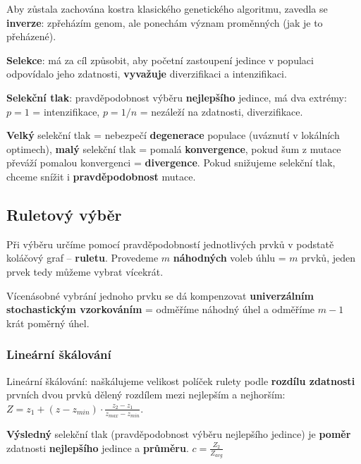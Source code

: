 \vspace{4pt}
\noindent Aby zůstala zachována kostra klasického genetického algoritmu, zavedla se \textbf{inverze}: zpřeházím genom, ale ponechám význam proměnných (jak je to přeházené).

\vspace{4pt}
\noindent \textbf{Selekce}: má za cíl způsobit, aby početní zastoupení jedince v populaci odpovídalo jeho zdatnosti, \textbf{vyvažuje} diverzifikaci a intenzifikaci.

\vspace{4pt}
\noindent \textbf{Selekční tlak}: pravděpodobnost výběru \textbf{nejlepšího} jedince, má dva extrémy: $p = 1$ = intenzifikace, $p = 1/n$ = nezáleží na zdatnosti, diverzifikace.

\vspace{4pt}
\noindent \textbf{Velký} selekční tlak = nebezpečí \textbf{degenerace} populace (uváznutí v lokálních optimech), \textbf{malý} selekční tlak = pomalá \textbf{konvergence}, pokud šum z mutace převáží pomalou konvergenci = \textbf{divergence}. Pokud snižujeme selekční tlak, chceme snížit i \textbf{pravděpodobnost} mutace.

\subsection{Ruletový výběr}

Při výběru určíme pomocí pravděpodobností jednotlivých prvků v podstatě koláčový graf – \textbf{ruletu}. Provedeme $m$ \textbf{náhodných} voleb úhlu = $m$ prvků, jeden prvek tedy můžeme vybrat vícekrát.

\vspace{4pt}
\noindent Vícenásobné vybrání jednoho prvku se dá kompenzovat \textbf{univerzálním stochastickým vzorkováním} = odměříme náhodný úhel a odměříme $m-1$ krát poměrný úhel.

\subsubsection*{Lineární škálování} 

Lineární škálování: naškálujeme velikost políček rulety podle \textbf{rozdílu zdatnosti} prvních dvou prvků dělený rozdílem mezi nejlepším a nejhorším: $Z = z_1 + (z - z_{min}) \cdot \frac{z_2 - z_1}{z_{max} - z_{min}}$.

\vspace{4pt}
\noindent \textbf{Výsledný} selekční tlak (pravděpodobnost výběru nejlepšího jedince) je \textbf{poměr} zdatnosti \textbf{nejlepšího} jedince a \textbf{průměru}. $c = \frac{Z_2}{Z_{avg}}$

